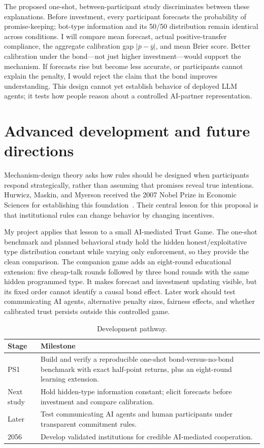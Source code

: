 The proposed one-shot, between-participant study discriminates between these explanations. Before investment, every participant forecasts the probability of promise-keeping; bot-type information and its 50/50 distribution remain identical across conditions. I will compare mean forecast, actual positive-transfer compliance, the aggregate calibration gap $|\overline{p}-\overline{y}|$, and mean Brier score. Better calibration under the bond---not just higher investment---would support the mechanism. If forecasts rise but become less accurate, or participants cannot explain the penalty, I would reject the claim that the bond improves understanding. This design cannot yet establish behavior of deployed LLM agents; it tests how people reason about a controlled AI-partner representation.

\section{Advanced development and future directions}

Mechanism-design theory asks how rules should be designed when participants respond strategically, rather than assuming that promises reveal true intentions. Hurwicz, Maskin, and Myerson received the 2007 Nobel Prize in Economic Sciences for establishing this foundation~\cite{nobel2007}. Their central lesson for this proposal is that institutional rules can change behavior by changing incentives.

My project applies that lesson to a small AI-mediated Trust Game. The one-shot benchmark and planned behavioral study hold the hidden honest/exploitative type distribution constant while varying only enforcement, so they provide the clean comparison. The companion game adds an eight-round educational extension: five cheap-talk rounds followed by three bond rounds with the same hidden programmed type. It makes forecast and investment updating visible, but its fixed order cannot identify a causal bond effect. Later work should test communicating AI agents, alternative penalty sizes, fairness effects, and whether calibrated trust persists outside this controlled game.

\begin{table}[h]
\caption{Development pathway.}
\begin{tabularx}{\columnwidth}{@{}p{1.5cm}Y@{}}
\toprule
\textbf{Stage} & \textbf{Milestone} \\
\midrule
PS1 & Build and verify a reproducible one-shot bond-versus-no-bond benchmark with exact half-point returns, plus an eight-round learning extension.\\
Next study & Hold hidden-type information constant; elicit forecasts before investment and compare calibration.\\
Later & Test communicating AI agents and human participants under transparent commitment rules.\\
2056 & Develop validated institutions for credible AI-mediated cooperation.\\
\bottomrule
\end{tabularx}
\end{table}

